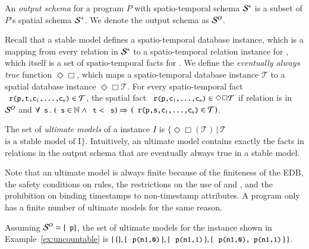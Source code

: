 An {\em output schema} for a \lang program $P$ with spatio-temporal schema
$\stschema$ is a subset of $P$'s spatial schema $\sschema$.  We denote the output schema as
$\oschema$.

Recall that a stable model defines a spatio-temporal database instance, which is a mapping from every relation  in $\stschema$ to a spatio-temporal relation instance for , which itself is a set of spatio-temporal facts for .  We define the {\em eventually always true} function $\Diamond\Box$, which maps a spatio-temporal database instance $\mathcal{T}$ to a spatial database instance $\Diamond\Box\mathcal{T}$.  For every spatio-temporal fact $\dedalus{r(p,t,c\sub{1},\ldots,c\sub{n})} \in \mathcal{T}$, the spatial fact $\dedalus{r(p,c\sub{1},\ldots,c\sub{n})} \in \Diamond\Box\mathcal{T}$ if relation  is in $\oschema$ and $\forall \dedalus{s}\, . \, \left(\dedalus{s} \in \mathbb{N} \land \dedalus{t} < \dedalus{s}\right) \Rightarrow$ \linebreak $\left(\dedalus{r(p,s,c\sub{1},\ldots,c\sub{n})} \in \mathcal{T}\right)$.

The set of {\em ultimate models} of a \lang instance $I$ is
$\{\Diamond\Box(\mathcal{T}) \, | \, \mathcal{T}$ $\text{is a stable model of
  I}\}$.  Intuitively, an ultimate model contains exactly the facts in relations
in the output schema that are eventually always true in a stable model.

Note that an ultimate model is always finite because of the finiteness of the EDB, the safety conditions on rules, the restrictions on the use of  and , and the prohibition on binding timestamps to non-timestamp attributes.  A \lang program only has a finite number of ultimate models for the same reason.

\begin{example}
Assuming $\oschema = \{\dedalus{p}\}$, the set of ultimate models for the \lang instance shown in Example~\ref{ex:uncountable} is \linebreak $\{ \, \{\}, \{ \, \dedalus{p(n1,0)} \, \}, \{ \, \dedalus{p(n1,1)} \, \}, \{ \, \dedalus{p(n1,0), p(n1,1)} \, \} \, \}$.
\end{example}



